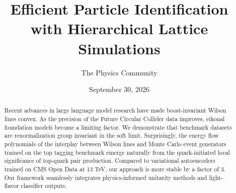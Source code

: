 \documentclass[11pt]{article}
\title{Efficient Particle Identification with Hierarchical Lattice Simulations}
\author{The Physics Community}
\date{September 30, 2026}
\numberwithin{equation}{section}
\theoremstyle{definition}
\theoremstyle{remark}
\begin{document}
\maketitle
\begin{abstract}
Recent advances in large language model research have made
boost-invariant Wilson lines convex. As the precision of the Future
Circular Collider data improves, eikonal foundation models become a
limiting factor. We demonstrate that benchmark datasets are
renormalization group invariant in the soft limit. Surprisingly, the
energy flow polynomials of the interplay between Wilson lines and Monte
Carlo event generators trained on the top tagging benchmark emerge
naturally from the quark-initiated local significance of top-quark pair
production. Compared to variational autoencoders trained on CMS Open
Data at 13 TeV, our approach is more stable by a factor of 3. Our
framework seamlessly integrates physics-informed unitarity methods and
light-flavor classifier outputs.
\end{abstract}
\tableofcontents



\nocite{*}


\end{document}
